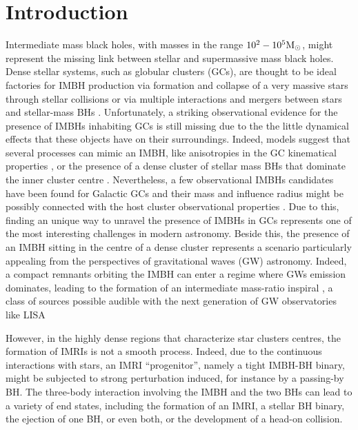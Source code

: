 \documentclass[twocolumn]{aastex62}
\newcommand{\Ms}{{\rm M}_\odot}
\begin{document}
\section{Introduction}

Intermediate mass black holes, with masses in the range $10^2-10^5\Ms$, might
represent the missing link between stellar and supermassive mass black holes.
Dense stellar systems, such as globular clusters (GCs), are thought to be ideal
factories for IMBH production via formation and collapse of a very massive
stars through stellar collisions \citep{zwart02, giersz15, mapelli16} or via
multiple interactions and mergers between stars and stellar-mass BHs
\citep{giersz15}. Unfortunately, a striking observational evidence for the
presence of IMBHs inhabiting GCs is still missing due to the the little
dynamical effects that these objects have on their surroundings. Indeed, models
suggest that several processes can mimic an IMBH, like anisotropies in the GC
kinematical properties \citep{zocchi}, or the presence of a dense cluster of
stellar mass BHs that dominate the inner cluster centre
\citep{AAG18a,AAG18b,AS16,vandermarel10}. Nevertheless, a few observational
IMBHs candidates have been found for Galactic GCs
\citep{noyola10,lu13,lanzoni13,kiziltan17} and their mass and influence radius
might be possibly connected with the host cluster observational properties
\citep{AAG18a}. Due to this, finding an unique way to unravel the presence of
IMBHs in GCs represents one of the most interesting challenges in modern
astronomy. Beside this, the presence of an IMBH sitting in the centre of a
dense cluster represents a scenario particularly appealing from the
perspectives of gravitational waves (GW) astronomy. Indeed, a compact remnants
orbiting the IMBH can enter a regime where GWs emission dominates, leading to
the formation of an intermediate mass-ratio inspiral
\citep[IMRI,][]{konstantinidis13,haster16,leigh14}, a class of sources possible
audible with the next generation of GW observatories like LISA
\citep{seoane07,amaro12,seoane18}

However, in the highly dense regions that characterize star clusters centres,
the formation of IMRIs is not a smooth process. Indeed, due to the continuous
interactions with stars, an IMRI ``progenitor'', namely a tight IMBH-BH binary,
might be subjected to strong perturbation induced, for instance by a passing-by
BH. The three-body interaction involving the IMBH and the two BHs can lead to a
variety of end states, including the formation of an IMRI, a stellar BH binary,
the ejection of one BH, or even both, or the development of a head-on
collision. 
\end{document}
